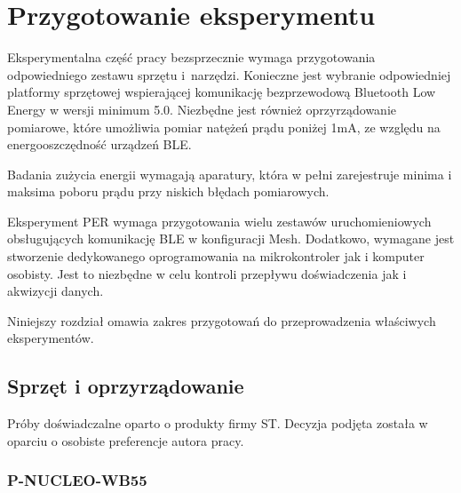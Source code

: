 \lipsum[1-3]

\section{Przygotowanie eksperymentu}

Eksperymentalna część pracy bezsprzecznie wymaga przygotowania odpowiedniego zestawu
sprzętu i~narzędzi. Konieczne jest wybranie odpowiedniej platformy sprzętowej
wspierającej komunikację bezprzewodową Bluetooth Low Energy w wersji minimum 5.0.
Niezbędne jest również oprzyrządowanie pomiarowe, które umożliwia pomiar natężeń
prądu poniżej 1mA, ze względu na energooszczędność urządzeń \gls{BLE}.


Badania zużycia energii wymagają aparatury, która w pełni zarejestruje minima i maksima
poboru prądu przy niskich błędach pomiarowych.

Eksperyment \gls{PER} wymaga przygotowania wielu zestawów uruchomieniowych obsługujących
komunikację BLE w konfiguracji Mesh. Dodatkowo, wymagane jest stworzenie dedykowanego oprogramowania
na mikrokontroler jak i komputer osobisty. Jest to niezbędne w celu kontroli przepływu
doświadczenia jak i akwizycji danych.

Niniejszy rozdział omawia zakres przygotowań do przeprowadzenia właściwych eksperymentów.


\subsection{Sprzęt i oprzyrządowanie}

Próby doświadczalne oparto o produkty firmy ST. Decyzja podjęta została w oparciu
o osobiste preferencje autora pracy.

\subsubsection{P-NUCLEO-WB55}

